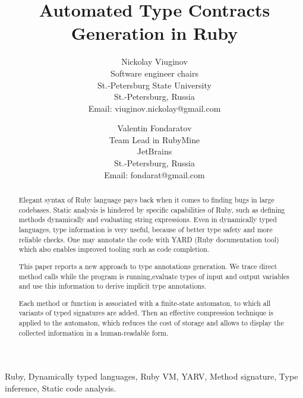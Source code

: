 \documentclass[conference]{IEEEtran}
\begin{document}
\title{Automated Type Contracts Generation in Ruby}
\author
{
    \IEEEauthorblockN
    {
        Nickolay Viuginov 
    }
    
    \IEEEauthorblockA
    {
        Software engineer chairs\\
        St.-Petersburg State University\\
        St.-Petersburg, Russia\\
        Email: viuginov.nickolay@gmail.com
    }
    \and
    \IEEEauthorblockN
    {
        Valentin Fondaratov 
    }
    
    \IEEEauthorblockA
    {
        Team Lead in RubyMine\\
        JetBrains\\
        St.-Petersburg, Russia\\
        Email: fondarat@gmail.com
    }

}
\maketitle

\begin{abstract}
Elegant syntax of Ruby language pays back when it comes to finding bugs in large codebases. Static analysis is
  hindered\cite{ruby_type_checker} by specific capabilities of Ruby, such as defining methods dynamically and evaluating
  string expressions.  Even in dynamically typed languages, type information is very useful, because of better type
  safety and more reliable checks.  One may annotate the code with YARD (Ruby documentation tool) which also enables
  improved tooling such as code completion.

This paper reports a new approach to type annotations generation. We trace direct method calls while the program is
  running,evaluate types of input and output variables and use this information to derive implicit type annotations.

Each method or function is associated with a finite-state automaton, to which all variants of typed signatures are
  added. Then an effective compression technique is applied to the automaton, which reduces the cost of storage and
  allows to display the collected information in a human-readable form.
 
\end{abstract}

\begin{IEEEkeywords}
Ruby, Dynamically typed languages, Ruby VM, YARV, Method signature, Type inference, Static code analysis.
\end{IEEEkeywords}
\IEEEpeerreviewmaketitle
\end{document}
